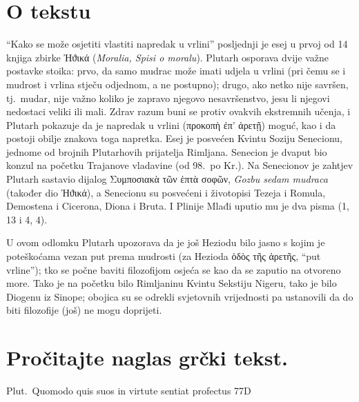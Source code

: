 
\section*{O tekstu}

``Kako se može osjetiti vlastiti napredak u vrlini'' posljednji je esej u prvoj od 14 knjiga zbirke \textgreek[variant=ancient]{Ἠϑικά} (\textit{Moralia, Spisi o moralu}). Plutarh osporava dvije važne postavke stoika: prvo, da samo mudrac može imati udjela u vrlini (pri čemu se i mudrost i vrlina stječu odjednom, a ne postupno); drugo, ako netko nije savršen, tj.\ mudar, nije važno koliko je zapravo njegovo nesavršenstvo, jesu li njegovi nedostaci veliki ili mali. Zdrav razum buni se protiv ovakvih ekstremnih učenja, i Plutarh pokazuje da je napredak u vrlini \textgreek[variant=ancient]{(προκοπὴ ἐπ' ἀρετῇ)} moguć, kao i da postoji obilje znakova toga napretka. Esej je posvećen Kvintu Soziju Senecionu, jednome od brojnih Plutarhovih prijatelja Rimljana. Senecion je dvaput bio konzul na početku Trajanove vladavine (od 98.\ po Kr.). Na Senecionov je zahtjev Plutarh sastavio dijalog \textgreek[variant=ancient]{Συμποσιακὰ τῶν ἑπτὰ σοφῶν,} \textit{Gozbu sedam mudraca} (također dio \textgreek[variant=ancient]{Ἠϑικά}), a Senecionu su posvećeni i životopisi Tezeja i Romula, Demostena i Cicerona, Diona i Bruta. I Plinije Mlađi uputio mu je dva pisma (1, 13 i 4, 4).

U ovom odlomku Plutarh upozorava da je još Heziodu bilo jasno s kojim je poteškoćama vezan put prema mudrosti (za Hezioda ὁδὸς τῆς ἀρετῆς, ``put vrline''); tko se počne baviti filozofijom osjeća se kao da se zaputio na otvoreno more. Tako je na početku bilo Rimljaninu Kvintu Sekstiju Nigeru, tako je bilo Diogenu iz Sinope; obojica su se odrekli svjetovnih vrijednosti pa ustanovili da do biti filozofije (još) ne mogu doprijeti.


\section*{Pročitajte naglas grčki tekst.}

Plut.\ Quomodo quis suos in virtute sentiat profectus 77D


\medskip


